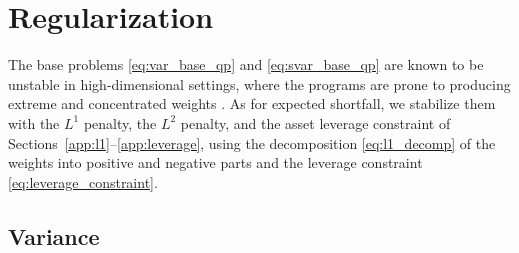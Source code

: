 \section{Regularization} \label{app:mv_regularization}

The base problems \eqref{eq:var_base_qp} and \eqref{eq:svar_base_qp} are known to be unstable in high-dimensional
settings, where the programs are prone to producing extreme and concentrated weights \citep{Michaud1989, kondor2007noise}. As for
expected shortfall, we stabilize them with the $L^1$ penalty, the $L^2$ penalty, and the asset leverage constraint of
Sections~\ref{app:l1}--\ref{app:leverage}, using the decomposition \eqref{eq:l1_decomp} of the weights into positive
and negative parts and the leverage constraint \eqref{eq:leverage_constraint}.

\subsection{Variance} \label{app:mv_var_reg}

